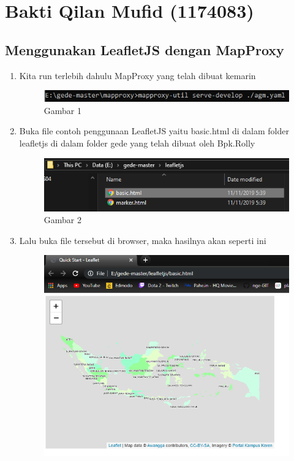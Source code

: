 \section{Bakti Qilan Mufid (1174083)}
\subsection{Menggunakan LeafletJS dengan MapProxy}
\begin{enumerate}
    \item Kita run terlebih dahulu MapProxy yang telah dibuat kemarin
    \hfill\break
    \begin{figure}[H]
		\includegraphics[width=12cm]{figures/Tugas5/1174083/pic1.png}
		\centering
		\caption{Gambar 1}
	\end{figure}
    \item Buka file contoh penggunaan LeafletJS yaitu basic.html di dalam folder leafletjs di dalam folder gede yang telah dibuat oleh Bpk.Rolly
    \hfill\break
    \begin{figure}[H]
		\includegraphics[width=12cm]{figures/Tugas5/1174083/pic2.png}
		\centering
		\caption{Gambar 2}
	\end{figure}
    \item Lalu buka file tersebut di browser, maka hasilnya akan seperti ini
    \hfill\break
    \begin{figure}[H]
		\includegraphics[width=12cm]{figures/Tugas5/1174083/pic3.png}

\end{figure}
\end{enumerate}
